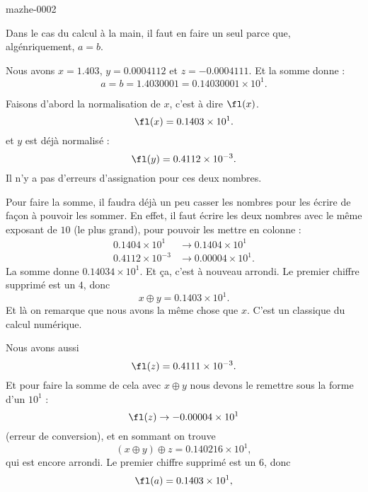 
\begin{corrige}{mazhe-0002}

Dans le cas du calcul à la main, il faut en faire un seul parce que, algénriquement, \( a=b\).

Nous avons \( x=1.403\), \( y=0.0004112\) et \( z=-0.0004111\). Et la somme donne :
\begin{equation}
    a=b=1.4030001=0.14030001\times 10^1.
\end{equation}

Faisons d'abord la normalisation de \( x\), c'est à dire \( \fl(x)\).
\begin{equation}
    \fl(x)=0.1403\times 10^1.
\end{equation}
et \( y\) est déjà normalisé :
\begin{equation}
    \fl(y)=0.4112\times 10^{-3}.
\end{equation}
Il n'y a pas d'erreurs d'assignation pour ces deux nombres. 

Pour faire la somme, il faudra déjà un peu casser les nombres pour les écrire de façon à pouvoir les sommer. En effet, il faut écrire les deux nombres avec le même exposant de \( 10\) (le plus grand), pour pouvoir les mettre en colonne :
\begin{subequations}
    \begin{align}
        0.1404\times 10^1&\to 0.1404\times 10^1\\
        0.4112\times 10^{-3}&\to 0.00004\times 10^1.
    \end{align}
\end{subequations}
La somme donne \( 0.14034\times 10 ^1\). Et ça, c'est à nouveau arrondi. Le premier chiffre supprimé est un \( 4\), donc 
\begin{equation}
    x\oplus y=0.1403\times 10^1.
\end{equation}
Et là on remarque que nous avons la même chose que \( x\). C'est un classique du calcul numérique.

Nous avons aussi
\begin{equation}
    \fl(z)=0.4111\times 10^{-3}.
\end{equation}
Et pour faire la somme de cela avec \( x\oplus y\) nous devons le remettre sous la forme d'un \( 10^1\) :
\begin{equation}
    \fl(z)\to -0.00004\times 10^1
\end{equation}
(erreur de conversion), et en sommant on trouve
\begin{equation}
    (x\oplus y)\oplus z=0.140216\times 10^1,
\end{equation}
qui est encore arrondi. Le premier chiffre supprimé est un \( 6\), donc
\begin{equation}
    \fl(a)=0.1403\times 10^1,
\end{equation}


\end{corrige}
